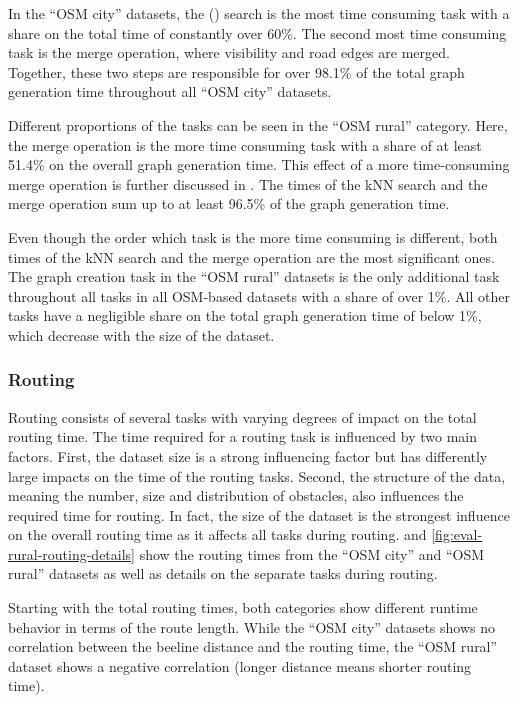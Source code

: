 			In the \enquote{OSM city} datasets, the  () search is the most time consuming task with a share on the total time of constantly over 60\%.
			The second most time consuming task is the merge operation, where visibility and road edges are merged.
			Together, these two steps are responsible for over 98.1\% of the total graph generation time throughout all \enquote{OSM city} datasets.
			
			Different proportions of the tasks can be seen in the \enquote{OSM rural} category.
			Here, the merge operation is the more time consuming task with a share of at least 51.4\% on the overall graph generation time.
			This effect of a more time-consuming merge operation is further discussed in .
			The times of the kNN search and the merge operation sum up to at least 96.5\% of the graph generation time.
			
			Even though the order which task is the more time consuming is different, both times of the kNN search and the merge operation are the most significant ones.
			The graph creation task in the \enquote{OSM rural} datasets is the only additional task throughout all tasks in all OSM-based datasets with a share of over 1\%.
			All other tasks have a negligible share on the total graph generation time of below 1\%, which decrease with the size of the dataset.
	
		\subsubsection{Routing}
		
			Routing consists of several tasks with varying degrees of impact on the total routing time.
			The time required for a routing task is influenced by two main factors.
			First, the dataset size is a strong influencing factor but has differently large impacts on the time of the routing tasks.
			Second, the structure of the data, meaning the number, size and distribution of obstacles, also influences the required time for routing.
			In fact, the size of the dataset is the strongest influence on the overall routing time as it affects all tasks during routing.
			 and \ref{fig:eval-rural-routing-details} show the routing times from the \enquote{OSM city} and \enquote{OSM rural} datasets as well as details on the separate tasks during routing.
			
			Starting with the total routing times, both categories show different runtime behavior in terms of the route length.
			While the \enquote{OSM city} datasets shows no correlation between the beeline distance and the routing time, the \enquote{OSM rural} dataset shows a negative correlation (longer distance means shorter routing time).
			
